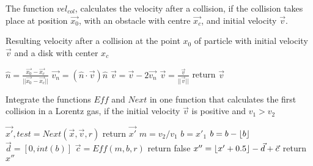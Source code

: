 \documentclass{iopart}
\begin{document}
The function $vel_{col}$, calculates the velocity after a collision, if the collision takes place at position $\vec{x_0}$, with an obstacle with centre $\vec{x_c}$, and initial velocity $\vec{v}$.
\begin{algorithm}
\caption{Resulting velocity after a collision at the point $x_0$ of particle with initial velocity $\vec{v}$ and a disk with center $x_c$ }
\label{alg:vel}
\begin{algorithmic}
\State    $\hat{n}=\frac{\vec{x_0}-\vec{x_c}}{||\vec{x_0}-\vec{x_c}||}$
\State    $\vec{v_n}=(\hat{n}\cdot \vec{v}) \hat{n}$
\State    $\vec{v}=\vec{v}-2 \vec{v_n}$
\State    $\vec{v}=\frac{\vec{v}}{||\vec{v}||}$
\State    return $\vec{v}$
\EndFunction
\end{algorithmic}
\end{algorithm}



\begin{algorithm}
\caption{ Integrate the functions $Eff$ and $Next$ in one function that calculates the first collision in a Lorentz gas, if the initial velocity $\vec{v}$ is positive and $v_1>v_2$}
\label{alg:Lor}
\begin{algorithmic}
\State    $\vec{x'},test=Next(\vec{x},\vec{v},r)$
\State        return $\vec{x'}$
\EndIf
\State    $m=v_2/v_1$
\State    $b=x'_1$
\State    $b=b-\floor*{b}$
\State    $\vec{d}=[0, int(b)]$
\State    $\vec{c}=Eff(m,b,r)$
\State        return false
\EndIf
\State    $x''=\floor*{x'+0.5}-\vec{d}+\vec{c}$
\State    return $x''$

\EndFunction
\end{algorithmic}
\end{algorithm}
\end{document}
